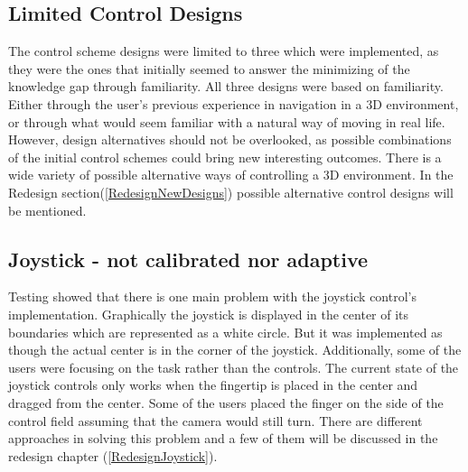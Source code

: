 \subsection*{Limited Control Designs} 
The control scheme designs were limited to three which were implemented, as they were the ones that initially seemed to answer the minimizing of the knowledge gap through familiarity. All three designs were based on familiarity. Either through the user's previous experience in navigation in a 3D environment, or through what would seem familiar with a natural way of moving in real life. However, design alternatives should not be overlooked, as possible combinations of the initial control schemes could bring new interesting outcomes. There is a wide variety of possible alternative ways of controlling a 3D environment. In the Redesign section(\ref{RedesignNewDesigns}) possible alternative control designs will be mentioned.

\subsection*{Joystick - not calibrated nor adaptive}\label{DiscussionJoystick}
Testing showed that there is one main problem with the joystick control's implementation. Graphically the joystick is displayed in the center of its boundaries which are represented as a white circle. But it was implemented as though the actual center is in the corner of the joystick. Additionally, some of the users were focusing on the task rather than the controls. The current state of the joystick controls only works when the fingertip is placed in the center and dragged from the center. Some of the users placed the finger on the side of the control field assuming that the camera would still turn. There are different approaches in solving this problem and a few of them will be discussed in the redesign chapter (\ref{RedesignJoystick}). 


